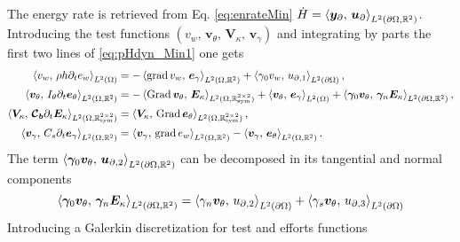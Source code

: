 The energy rate is retrieved from Eq. \eqref{eq:enrateMin} $\dot{H} = \inner[L^2(\partial\Omega, \mathbb{R}^2)]{\bm{y}_\partial}{\bm{u}_\partial}$. Introducing the test functions $(v_w,\, \bm{v}_\theta, \, \bm{V}_\kappa, \, \bm{v}_\gamma)$ and integrating by parts the first two lines of \eqref{eq:pHdyn_Min1} one gets 
\begin{equation}
\begin{aligned}
\inner[L^2(\Omega)]{v_w}{\rho h \partial_t e_w} &= -\inner[L^2(\Omega, \mathbb{R}^{2})]{\grad v_w}{\bm{e}_\gamma} + \inner[L^2(\partial\Omega)]{\gamma_0 v_w}{{u}_{\partial, 1}}, \\
\inner[L^2(\Omega, \mathbb{R}^{2})]{\bm{v}_\theta}{I_\theta \partial_t \bm{e}_\theta} &= -\inner[L^2(\Omega, \mathbb{R}^{2\times 2}_{\text{sym}})]{\Grad \bm{v}_\theta}{\bm{E}_\kappa} + \inner[L^2(\Omega)]{\bm{v}_\theta}{\bm{e}_\gamma} + \inner[L^2(\partial\Omega, \mathbb{R}^2)]{\bm\gamma_0 \bm{v}_\theta}{\bm\gamma_n \bm{E}_{\kappa}}, \\
\inner[L^2(\Omega, \mathbb{R}^{2\times 2}_{\text{sym}})]{\bm{V}_\kappa}{\bm{\mathcal{C}_b} \partial_t \bm{E}_\kappa} &= \inner[L^2(\Omega, \mathbb{R}^{2\times 2}_{\text{sym}})]{\bm{V}_\kappa}{\Grad \bm{e}_\theta}, \\
\inner[L^2(\Omega, \mathbb{R}^{2})]{\bm{v}_\gamma}{C_s \partial_t \bm{e}_\gamma} &= \inner[L^2(\Omega, \mathbb{R}^{2})]{\bm{v}_\gamma}{\grad e_w} - \inner[L^2(\Omega, \mathbb{R}^{2})]{\bm{v}_\gamma}{\bm{e}_\theta}. \\
\end{aligned}
\end{equation}
The term $\inner[L^2(\partial\Omega, \mathbb{R}^2)]{\bm\gamma_0 \bm{v}_\theta}{\bm{u}_{\partial,2}}$ can be decomposed in its tangential and normal components
\begin{equation}
	\inner[L^2(\partial\Omega, \mathbb{R}^2)]{\bm\gamma_0 \bm{v}_\theta}{\bm\gamma_n \bm{E}_{\kappa}} = \inner[L^2(\partial\Omega)]{\gamma_n \bm{v}_\theta}{{u}_{\partial,2}} + \inner[L^2(\partial\Omega)]{\gamma_s \bm{v}_\theta}{{u}_{\partial,3}}
\end{equation}
Introducing a Galerkin discretization for test and efforts functions
